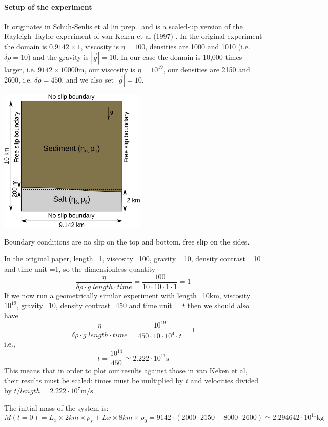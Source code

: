 
\paragraph{Setup of the experiment} It originates in Schuh-Senlis et al [in prep.] and 
is a scaled-up version of the Rayleigh-Taylor experiment of van Keken et al (1997) \cite{vaks97}.
In the original experiment the domain is $0.9142\times1$, viscosity is $\eta=100$, 
densities are 1000 and 1010 (i.e. $\delta \rho=10$) and the gravity is $|\vec{g}|=10$.
In our case the domain is 10,000 times larger, i.e. $9142\times10000$m, 
our viscosity is $\eta=10^{19}$, our densities are 2150 and 2600, i.e. $\delta\rho = 450$, 
and we also set $|\vec{g}|=10$.

\begin{center}
\includegraphics[width=7cm]{python_codes/fieldstone_41/images/setup}
\end{center}

Boundary conditions are no slip on the top and bottom, free slip on the sides.


In the original paper, 
length=1, viscosity=100, gravity =10, density contrast =10 and time unit =1,
so the dimensionless quantity
\[
\frac{\eta}{\delta\rho \cdot g \; length \cdot time} = \frac{100}{10 \cdot 10 \cdot 1 \cdot 1} =1
\]
If we now run a geometrically similar experiment with 
length=10km, viscosity=$10^{19}$, gravity=10, density contrast=450 and time unit = $t$
then we should also have 
\[
\frac{\eta}{\delta\rho \cdot g \; length \cdot time} = \frac{10^{19}}{450 \cdot 10 \cdot 10^4 \cdot t} =1
\]
i.e.,
\[
t = \frac{10^{14}}{450} \simeq 2.222 \cdot 10^{11}\text{s}
\]
This means that in order to plot our results against those in van Keken et al, their results
must be scaled: times must be multiplied by $t$ and velocities divided by 
$t/length = 2.222 \cdot 10^{7}\text{m/s}$  

The initial mass of the system is:
\[
M(t=0) = L_x \times 2km \times \rho_s + Lx \times 8km \times \rho_0 = 
9142 \cdot(2000\cdot 2150 + 8000\cdot 2600) \simeq 2.294642\cdot 10^{11}\text{kg}
\]

